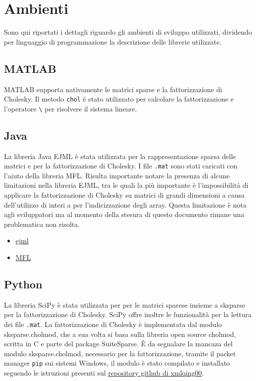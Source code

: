 \documentclass{report}
\begin{document}
    \chapter[Enviroments]{Ambienti}
        Sono qui riportati i dettagli riguardo gli ambienti di sviluppo utilizzati, 
        dividendo per linguaggio di programmazione la descrizione delle librerie utilizzate.

        \section{MATLAB}
            MATLAB supporta nativamente le matrici sparse e la fattorizzazione di Cholesky.
            Il metodo \texttt{chol} è stato utilizzato per calcolare la fattorizzazione e
            l'operatore \verb$\$ per risolvere il sistema lineare.

        \section{Java}
            La libreria Java EJML è stata utilizzata per la rappresentazione sparsa delle matrici
            e per la fattorizzazione di Cholesky.
            I file \texttt{.mat} sono stati caricati con l'aiuto della libreria MFL.
            Risulta importante notare la presenza di alcune limitazioni nella libreria EJML,
            tra le quali la più importante è l'impossibilità di applicare la fattorizzazione di Cholesky
            su matrici di grandi dimensioni a causa dell'utilizzo di interi a per l'indicizzazione degli array.
            Questa limitazione è nota agli sviluppatori ma al momento della stesura di questo documento rimane
            una problematica non risolta.

            \begin{itemize}
                \item \href{http://ejml.org/}{ejml}
                \item \href{https://github.com/HebiRobotics/MFL}{MFL}
            \end{itemize}
            
        \section{Python}
            La libreria SciPy è stata utilizzata per per le matrici sparese insieme a sksparse per la fattorizzazione 
            di Cholesky.
            SciPy offre inoltre le funzionalità per la lettura dei file \texttt{.mat}.
            La fattorizzazione di Cholesky è implementata dal modulo sksparse.cholmod, che a sua volta si basa sulla
            libreria open source cholmod, scritta in C e parte del package SuiteSparse.
            \`E da segnalare la mancaza del modulo sksparse.cholmod, necessario per la fattorizzazione, tramite il 
            packet manager \texttt{pip} sui sistemi Windows, il modulo è stato compilato e installato seguendo le
            istruzioni presenti sul 
            \href{https://github.com/xmlyqing00/Cholmod-Scikit-Sparse-Windows}{repository github di xmlqing00}.
\end{document}
